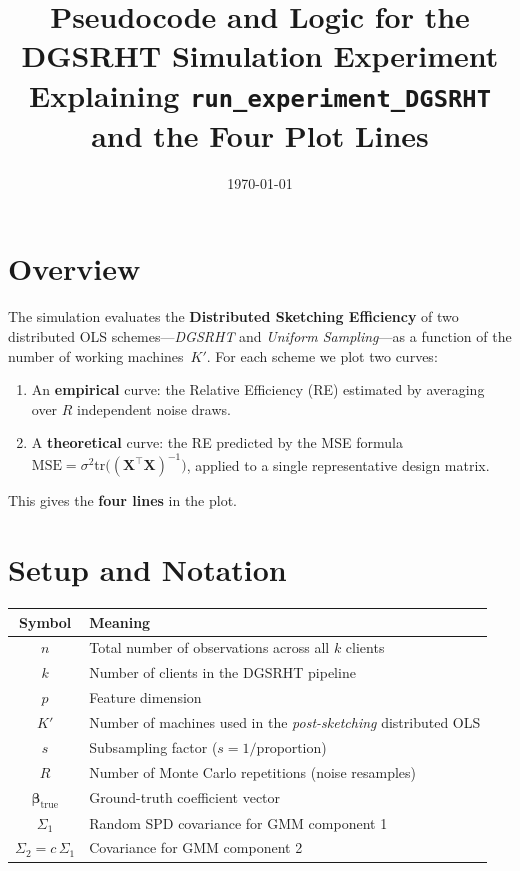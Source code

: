 \documentclass[11pt,a4paper]{article}
\title{Pseudocode and Logic for the DGSRHT Simulation Experiment\\[4pt]
\large Explaining \texttt{run\_experiment\_DGSRHT} and the Four Plot Lines}
\author{}
\date{\today}
\newcommand{\bX}{\mathbf{X}}
\newcommand{\bbeta}{\boldsymbol{\beta}}
\newcommand{\MSE}{\mathrm{MSE}}
\newcommand{\tr}{\mathrm{tr}}
\begin{document}
\maketitle

\section{Overview}

The simulation evaluates the \textbf{Distributed Sketching Efficiency} of two
distributed OLS schemes---\emph{DGSRHT} and \emph{Uniform Sampling}---as a
function of the number of working machines~$K'$.
For each scheme we plot two curves:
\begin{enumerate}[label=(\roman*)]
  \item An \textbf{empirical} curve: the Relative Efficiency (RE) estimated by
        averaging over $R$ independent noise draws.
  \item A \textbf{theoretical} curve: the RE predicted by the MSE formula
        $\MSE = \sigma^2 \tr\!\bigl((\bX^\top \bX)^{-1}\bigr)$, applied to a
        single representative design matrix.
\end{enumerate}
This gives the \textbf{four lines} in the plot.

\section{Setup and Notation}

\begin{center}
\begin{tabular}{cl}
\toprule
Symbol & Meaning \\
\midrule
$n$    & Total number of observations across all $k$ clients \\
$k$    & Number of clients in the DGSRHT pipeline \\
$p$    & Feature dimension \\
$K'$   & Number of machines used in the \emph{post-sketching} distributed OLS \\
$s$    & Subsampling factor ($s = 1/\text{proportion}$) \\
$R$    & Number of Monte Carlo repetitions (noise resamples) \\
$\bbeta_{\mathrm{true}}$ & Ground-truth coefficient vector \\
$\Sigma_1$ & Random SPD covariance for GMM component 1 \\
$\Sigma_2 = c\,\Sigma_1$ & Covariance for GMM component 2 \\
\bottomrule
\end{tabular}
\end{center}
\end{document}
